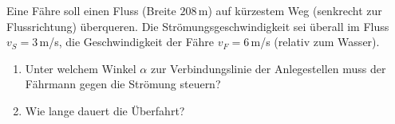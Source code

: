 \begin{ExerciseBlock}
Eine Fähre soll einen Fluss (Breite $208 \,$m) auf kürzestem Weg (senkrecht zur Flussrichtung) überqueren. Die Strömungsgeschwindigkeit sei überall im Fluss $v_S = 3 \,$m/s, die Geschwindigkeit der Fähre $v_F = 6 \,$m/s (relativ zum Wasser).

\begin{enumerate}
	\item Unter welchem Winkel $\alpha$ zur Verbindungslinie der Anlegestellen muss der Fährmann gegen die Strömung steuern?

	\item Wie lange dauert die Überfahrt?

\end{enumerate}
\end{ExerciseBlock}
